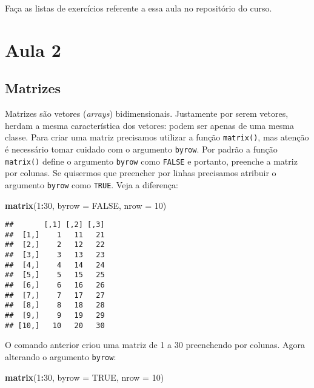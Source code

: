 \documentclass[]{book}
\newenvironment{Shaded}{\begin{snugshade}}{\end{snugshade}}
\newcommand{\DataTypeTok}[1]{\textcolor[rgb]{0.13,0.29,0.53}{#1}}
\newcommand{\DecValTok}[1]{\textcolor[rgb]{0.00,0.00,0.81}{#1}}
\newcommand{\KeywordTok}[1]{\textcolor[rgb]{0.13,0.29,0.53}{\textbf{#1}}}
\newcommand{\NormalTok}[1]{#1}
\newcommand{\OperatorTok}[1]{\textcolor[rgb]{0.81,0.36,0.00}{\textbf{#1}}}
\newcommand{\OtherTok}[1]{\textcolor[rgb]{0.56,0.35,0.01}{#1}}
\theoremstyle{definition}
\theoremstyle{definition}
\theoremstyle{definition}
\theoremstyle{remark}
\begin{document}
Faça as listas de exercícios referente a essa aula no repositório do curso.

\hypertarget{aula-2}{%
\chapter{Aula 2}\label{aula-2}}

\hypertarget{matrizes}{%
\section{Matrizes}\label{matrizes}}

Matrizes são vetores (\emph{arrays}) bidimensionais. Justamente por serem vetores, herdam a mesma característica dos vetores: podem ser apenas de uma mesma classe. Para criar uma matriz precisamos utilizar a função \texttt{matrix()}, mas atenção é necessário tomar cuidado com o argumento \texttt{byrow}. Por padrão a função \texttt{matrix()} define o argumento \texttt{byrow} como \texttt{FALSE} e portanto, preenche a matriz por colunas. Se quisermos que preencher por linhas precisamos atribuir o argumento \texttt{byrow} como \texttt{TRUE}. Veja a diferença:

\begin{Shaded}
\begin{Highlighting}[]
\KeywordTok{matrix}\NormalTok{(}\DecValTok{1}\OperatorTok{:}\DecValTok{30}\NormalTok{, }\DataTypeTok{byrow =} \OtherTok{FALSE}\NormalTok{, }\DataTypeTok{nrow =} \DecValTok{10}\NormalTok{) }
\end{Highlighting}
\end{Shaded}

\begin{verbatim}
##       [,1] [,2] [,3]
##  [1,]    1   11   21
##  [2,]    2   12   22
##  [3,]    3   13   23
##  [4,]    4   14   24
##  [5,]    5   15   25
##  [6,]    6   16   26
##  [7,]    7   17   27
##  [8,]    8   18   28
##  [9,]    9   19   29
## [10,]   10   20   30
\end{verbatim}

O comando anterior criou uma matriz de 1 a 30 preenchendo por colunas. Agora alterando o argumento \texttt{byrow}:

\begin{Shaded}
\begin{Highlighting}[]
\KeywordTok{matrix}\NormalTok{(}\DecValTok{1}\OperatorTok{:}\DecValTok{30}\NormalTok{, }\DataTypeTok{byrow =} \OtherTok{TRUE}\NormalTok{, }\DataTypeTok{nrow =} \DecValTok{10}\NormalTok{)}
\end{Highlighting}
\end{Shaded}
\end{document}
